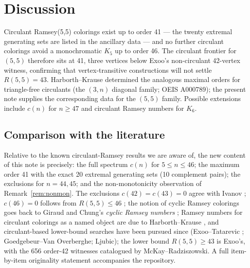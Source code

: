 \documentclass[11pt]{article}
\theoremstyle{remark}
\begin{document}
\section{Discussion}\label{sec:disc}
Circulant Ramsey(5,5) colorings exist up to order 41 --- the twenty extremal generating sets
are listed in the ancillary data --- and no further circulant colorings avoid a monochromatic
$K_5$ up to order 46. The circulant frontier for $(5,5)$ therefore sits at 41, three vertices
below Exoo's non-circulant 42-vertex witness, confirming that vertex-transitive constructions
will not settle $R(5,5)=43$. Harborth--Krause \cite{hk2003} determined the analogous maximal
orders for triangle-free circulants (the $(3,n)$ diagonal family; OEIS A000789); the present
note supplies the corresponding data for the $(5,5)$ family. Possible extensions include
$c(n)$ for $n\ge47$ and circulant Ramsey numbers for $K_6$.

\subsection*{Comparison with the literature}
Relative to the known circulant-Ramsey results we are aware of, the new content of this
note is precisely: the full spectrum $c(n)$ for $5\le n\le46$; the maximum order 41 with
the exact 20 extremal generating sets (10 complement pairs); the exclusions for
$n=44,45$; and the non-monotonicity observation of Remark~\ref{rem:nonmon}. The
exclusions $c(42)=c(43)=0$ agree with Ivanov \cite{ivanov2026}; $c(46)=0$ follows from
$R(5,5)\le46$ \cite{am2024}; the notion of cyclic Ramsey colorings goes back to Giraud \cite{giraud} and Chung's
\emph{cyclic Ramsey numbers} \cite{chung1974}; Ramsey numbers for circulant colorings as a
named object are due to Harborth--Krause \cite{hk2003}, and circulant-based lower-bound
searches have been pursued since (Exoo--Tatarevic \cite{ext15}; Goedgebeur--Van Overberghe;
Ljubic); the lower bound $R(5,5)\ge43$
is Exoo's, with the 656 order-42 witnesses catalogued by McKay--Radziszowski. A full
item-by-item originality statement accompanies the repository.
\end{document}
